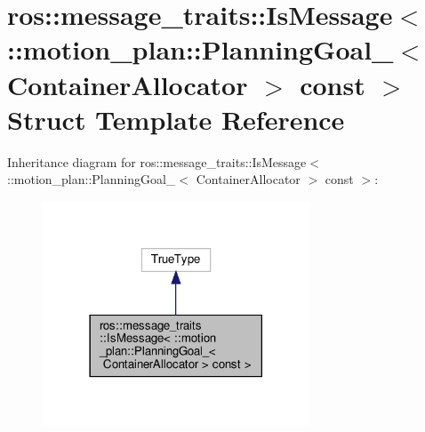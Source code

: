 \hypertarget{structros_1_1message__traits_1_1IsMessage_3_01_1_1motion__plan_1_1PlanningGoal___3_01ContainerAllocator_01_4_01const_01_4}{}\section{ros\+:\+:message\+\_\+traits\+:\+:Is\+Message$<$ \+:\+:motion\+\_\+plan\+:\+:Planning\+Goal\+\_\+$<$ Container\+Allocator $>$ const $>$ Struct Template Reference}
\label{structros_1_1message__traits_1_1IsMessage_3_01_1_1motion__plan_1_1PlanningGoal___3_01ContainerAllocator_01_4_01const_01_4}


Inheritance diagram for ros\+:\+:message\+\_\+traits\+:\+:Is\+Message$<$ \+:\+:motion\+\_\+plan\+:\+:Planning\+Goal\+\_\+$<$ Container\+Allocator $>$ const $>$\+:
\nopagebreak
\begin{figure}[H]
\begin{center}
\leavevmode
\includegraphics[width=225pt]{structros_1_1message__traits_1_1IsMessage_3_01_1_1motion__plan_1_1PlanningGoal___3_01ContainerAl85fd151923e43dae91f192c01a534b72}
\end{center}
\end{figure}


